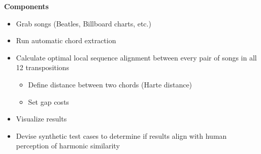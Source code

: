 \textbf{Components}

\begin{itemize}
\item Grab songs (Beatles, Billboard charts, etc.)
\item Run automatic chord extraction
\item Calculate optimal local sequence alignment between every pair of songs in all 12 transpositions
    \begin{itemize}
    \item Define distance between two chords (Harte distance)
    \item Set gap costs
    \end{itemize}
\item Visualize results
\item Devise synthetic test cases to determine if results align with human perception of harmonic similarity
\end{itemize}
